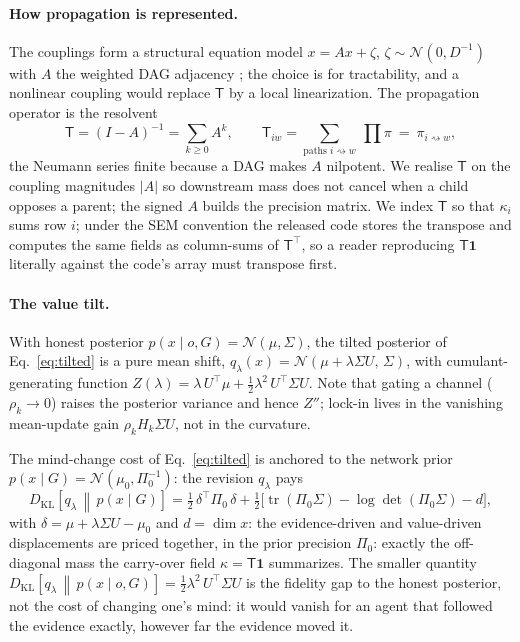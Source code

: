 \documentclass[runningheads]{llncs}
\newcommand{\KL}[2]{D_{\mathrm{KL}}\!\left[#1\,\middle\|\,#2\right]}
\newcommand{\rw}{\rightsquigarrow}
\newcommand{\Top}{\mathsf{T}}          %
\newcommand{\bone}{\mathbf{1}}         %
\begin{document}
\paragraph{How propagation is represented.} The couplings form a structural equation model $x=Ax+\zeta$,
$\zeta\sim\mathcal N(0,D^{-1})$ with $A$ the weighted DAG adjacency \citep{koller2009}; the choice is
for tractability, and a nonlinear coupling would replace $\Top$ by a local linearization. The
propagation operator is the resolvent
\begin{equation}
\Top=(I-A)^{-1}=\sum_{k\ge 0}A^k,\qquad
\Top_{iw}=\!\!\sum_{\text{paths }i\rw w}\ \prod \pi\ =\ \pi_{i\rw w},
\label{eq:Top-full}
\end{equation}
the Neumann series finite because a DAG makes $A$ nilpotent. We realise $\Top$ on the coupling
magnitudes $|A|$ so downstream mass does not cancel when a child opposes a parent; the signed $A$
builds the precision matrix. We index $\Top$ so that $\kappa_i$ sums row $i$; under the SEM
convention the released code stores the transpose and computes the same fields as column-sums of
$\Top^{\!\top}$, so a reader reproducing $\Top\bone$ literally against the code's array must
transpose first.

\paragraph{The value tilt.} With honest posterior $p(x\mid o,G)=\mathcal N(\mu,\Sigma)$, the tilted
posterior of Eq.~\eqref{eq:tilted} is a pure mean shift,
$q_\lambda(x)=\mathcal N(\mu+\lambda\Sigma U,\,\Sigma)$, with cumulant-generating function
$Z(\lambda)=\lambda\,U^{\!\top}\!\mu+\tfrac12\lambda^2\,U^{\!\top}\!\Sigma U$. Note that gating a
channel ($\rho_k\to0$) raises the posterior variance and hence $Z''$; lock-in lives in the
vanishing mean-update gain $\rho_k H_k\Sigma U$, not in the curvature.

The mind-change cost of Eq.~\eqref{eq:tilted} is anchored to the network prior
$p(x\mid G)=\mathcal N(\mu_0,\Pi_0^{-1})$: the revision $q_\lambda$ pays
\begin{equation}
\KL{q_\lambda}{p(x\mid G)}
=\tfrac12\,\delta^{\!\top}\Pi_0\,\delta
+\tfrac12\bigl[\operatorname{tr}(\Pi_0\Sigma)-\log\det(\Pi_0\Sigma)-d\bigr],
\label{eq:mindcost}
\end{equation}
with $\delta=\mu+\lambda\Sigma U-\mu_0$ and $d=\dim x$: the evidence-driven and value-driven
displacements are priced together, in
the prior precision $\Pi_0$: exactly the off-diagonal mass the carry-over field $\kappa=\Top\bone$
summarizes. The smaller quantity $\KL{q_\lambda}{p(x\mid o,G)}=\tfrac12\lambda^2\,U^{\!\top}\!\Sigma U$
is the fidelity gap to the honest posterior, not the cost of changing one's mind: it would vanish
for an agent that followed the evidence exactly, however far the evidence moved it.
\end{document}
